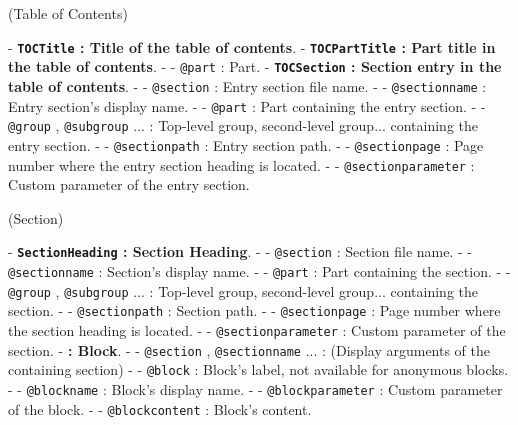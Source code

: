 (\large Table of Contents){
    \par\medskip{}
    - \textbf{\texttt{TOCTitle} : Title of the table of contents}.
    - \textbf{\texttt{TOCPartTitle} : Part title in the table of contents}.
        - - \texttt{@part} : Part.
    - \textbf{\texttt{TOCSection} : Section entry in the table of contents}.
        - - \texttt{@section} : Entry section file name.
        - - \texttt{@sectionname} : Entry section's display name.
        - - \texttt{@part} : Part containing the entry section.
        - - \texttt{@group} , \texttt{@subgroup} ... : Top-level group, second-level group... containing the entry section.
        - - \texttt{@sectionpath} : Entry section path.
        - - \texttt{@sectionpage} : Page number where the entry section heading is located.
        - - \texttt{@sectionparameter} : Custom parameter of the entry section.
}

(\large Section){
    \par\medskip{}
    - \textbf{\texttt{SectionHeading} : Section Heading}.
        - - \texttt{@section} : Section file name.
        - - \texttt{@sectionname} : Section's display name.
        - - \texttt{@part} : Part containing the section.
        - - \texttt{@group} , \texttt{@subgroup} ... : Top-level group, second-level group... containing the section.
        - - \texttt{@sectionpath} : Section path.
        - - \texttt{@sectionpage} : Page number where the section heading is located.
        - - \texttt{@sectionparameter} : Custom parameter of the section.
    - \textbf{ : Block}.
        - - \texttt{@section} , \texttt{@sectionname} ... : (Display arguments of the containing section)
        - - \texttt{@block} : Block's label, not available for anonymous blocks.
        - - \texttt{@blockname} : Block's display name.
        - - \texttt{@blockparameter} : Custom parameter of the block.
        - - \texttt{@blockcontent} : Block's content.
}

\newpage

